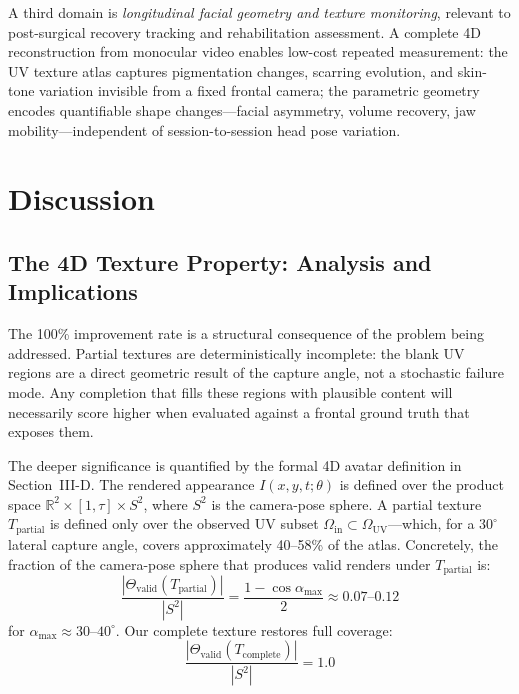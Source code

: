\documentclass[conference]{IEEEtran}
\newcommand{\R}{\mathbb{R}}
\newcommand{\OUV}{\Omega_{\text{UV}}}
\newcommand{\Oin}{\Omega_{\text{in}}}
\newcommand{\Tpartial}{T_{\text{partial}}}
\newcommand{\Tcomplete}{T_{\text{complete}}}
\begin{document}
A third domain is \emph{longitudinal facial geometry and texture monitoring},
relevant to post-surgical recovery tracking and rehabilitation assessment.
A complete 4D reconstruction from monocular video enables low-cost repeated
measurement: the UV texture atlas captures pigmentation changes, scarring
evolution, and skin-tone variation invisible from a fixed frontal camera; the
parametric geometry encodes quantifiable shape changes---facial asymmetry,
volume recovery, jaw mobility---independent of session-to-session head pose
variation.

\section{Discussion}

\subsection{The 4D Texture Property: Analysis and Implications}

The 100\% improvement rate is a structural consequence of the problem being
addressed. Partial textures are deterministically incomplete: the blank UV
regions are a direct geometric result of the capture angle, not a stochastic
failure mode. Any completion that fills these regions with plausible content
will necessarily score higher when evaluated against a frontal ground truth that
exposes them.

The deeper significance is quantified by the formal 4D avatar definition in
Section~III-D. The rendered appearance $I(x, y, t; \theta)$ is defined over
the product space $\R^2 \times [1, \tau] \times S^2$, where $S^2$ is the
camera-pose sphere. A partial texture $\Tpartial$ is defined only over the
observed UV subset $\Oin \subset \OUV$---which, for a $30^{\circ}$ lateral
capture angle, covers approximately 40--58\% of the atlas. Concretely, the
fraction of the camera-pose sphere that produces valid renders under
$\Tpartial$ is:
\begin{equation}
  \frac{|\Theta_{\text{valid}}(\Tpartial)|}{|S^2|}
  = \frac{1-\cos\alpha_{\max}}{2} \approx 0.07\text{--}0.12
  \label{eq:valid_sphere}
\end{equation}
for $\alpha_{\max} \approx 30$--$40^{\circ}$. Our complete texture restores
full coverage:
\begin{equation}
  \frac{|\Theta_{\text{valid}}(\Tcomplete)|}{|S^2|} = 1.0
  \label{eq:full_sphere}
\end{equation}
\end{document}
